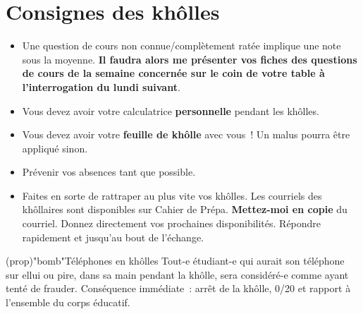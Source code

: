 \documentclass[a4paper, 12pt, final, garamond]{book}
\begin{document}
\setcounter{chapter}{0}

\chapter*{Consignes des khôlles}

\Large
\begin{itemize}
	\item Une question de cours non connue/complètement ratée implique une note
	      sous la moyenne. \textbf{Il faudra alors me présenter vos fiches des
		      questions de cours de la semaine concernée sur le coin de votre table à
		      l'interrogation du lundi suivant}.
	\item Vous devez avoir votre calculatrice \textbf{personnelle} pendant les
	      khôlles.
	\item Vous devez avoir votre \textbf{feuille de khôlle} avec vous~! Un malus
	      pourra être appliqué sinon.
	\item Prévenir vos absences tant que possible.
	\item Faites en sorte de rattraper au plus vite vos khôlles. Les courriels des
	      khôllaires sont disponibles sur Cahier de Prépa. \textbf{Mettez-moi en
		      copie} du courriel. Donnez directement vos prochaines disponibilités.
	      Répondre rapidement et jusqu'au bout de l'échange.
\end{itemize}

\begin{tcn}(prop)"bomb"{Téléphones en khôlles}
	Tout-e étudiant-e qui aurait son téléphone sur ellui ou pire, dans sa main
	pendant la khôlle, sera considéré-e comme ayant tenté de frauder.
	\bigbreak
	Conséquence immédiate~: arrêt de la khôlle, 0/20 et rapport à l'ensemble du
	corps éducatif.
\end{tcn}
\end{document}
